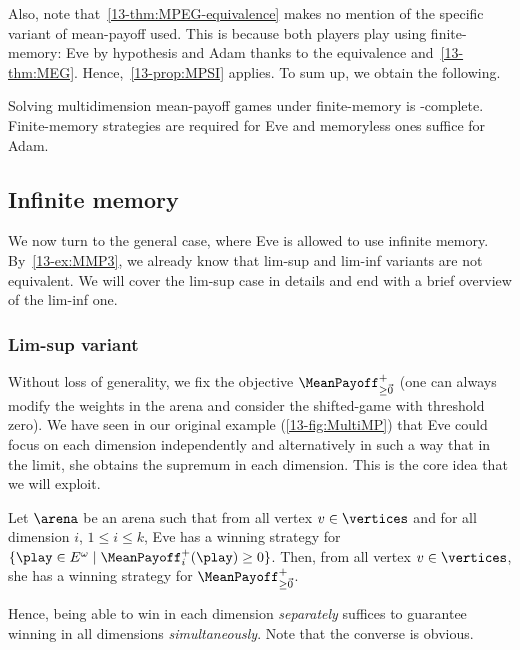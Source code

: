 Also, note that~\cref{13-thm:MPEG-equivalence} makes no mention of the specific variant of mean-payoff used. This is because both players play using finite-memory: Eve by hypothesis and Adam thanks to the equivalence and~\cref{13-thm:MEG}. Hence,~\cref{13-prop:MPSI} applies. To sum up, we obtain the following.

\begin{corollary}
Solving multidimension mean-payoff games under finite-memory is \coNP-complete. Finite-mem\-ory strategies are required for Eve and memoryless ones suffice for Adam.
\end{corollary}


\subsection{Infinite memory}

We now turn to the general case, where Eve is allowed to use infinite memory. By~\cref{13-ex:MMP3}, we already know that lim-sup and lim-inf variants are not equivalent. We will cover the lim-sup case in details and end with a brief overview of the lim-inf one.

\subsubsection*{Lim-sup variant}

Without loss of generality, we fix the objective $\MeanPayoff^{+}_{\geq \vec{0}}$ (one can always modify the weights in the arena and consider the shifted-game with threshold zero). We have seen in our original example (\cref{13-fig:MultiMP}) that Eve could focus on each dimension independently and alternatively in such a way that in the limit, she obtains the supremum in each dimension. This is the core idea that we will exploit.

\begin{lemma}
\label{13-lem:MMP-Eve}
Let $\arena$ be an arena such that from all vertex $v \in \vertices$ and for all dimension $i$, $1 \leq i \leq k$, Eve has a winning strategy for $\{\play \in E^\omega \mid \MeanPayoff^{+}_{i}(\play) \geq 0\}$. Then, from all vertex $v \in \vertices$, she has a winning strategy for $\MeanPayoff^{+}_{\geq \vec{0}}$.
\end{lemma}

Hence, being able to win in each dimension \textit{separately} suffices to guarantee winning in all dimensions \textit{simultaneously}. Note that the converse is obvious.

